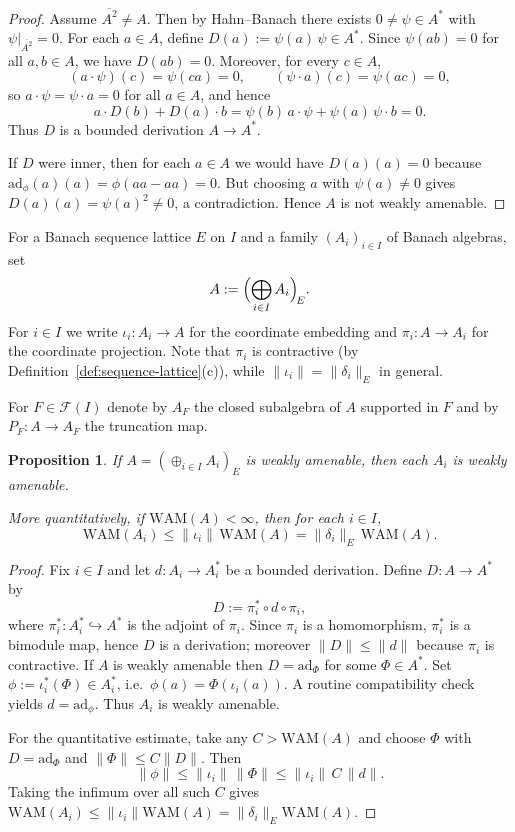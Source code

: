 \documentclass[reqno]{amsart}
\theoremstyle{plain}
\newtheorem{proposition}[theorem]{Proposition}
\theoremstyle{definition}
\theoremstyle{remark}
\newcommand{\cF}{\mathcal{F}}
\renewcommand{\le}{\leqslant}
\newcommand{\ad}{\mathrm{ad}}
\newcommand{\WAM}{\mathrm{WAM}}  %
\begin{document}
\begin{proof}
Assume $\overline{A^2}\neq A$. Then by Hahn--Banach there exists $0\neq\psi\in A^*$ with $\psi|_{\overline{A^2}}=0$.
For each $a\in A$, define $D(a):=\psi(a)\,\psi\in A^*$.
Since $\psi(ab)=0$ for all $a,b\in A$, we have $D(ab)=0$.
Moreover, for every $c\in A$,
\[
(a\cdot\psi)(c)=\psi(ca)=0,\qquad (\psi\cdot a)(c)=\psi(ac)=0,
\]
so $a\cdot\psi=\psi\cdot a=0$ for all $a\in A$, and hence
\[
a\cdot D(b)+D(a)\cdot b=\psi(b)\,a\cdot\psi+\psi(a)\,\psi\cdot b=0.
\]
Thus $D$ is a bounded derivation $A\to A^*$.

If $D$ were inner, then for each $a\in A$ we would have $D(a)(a)=0$ because
$\ad_\phi(a)(a)=\phi(aa-aa)=0$.  But choosing $a$ with $\psi(a)\neq 0$ gives
$D(a)(a)=\psi(a)^2\neq 0$, a contradiction. Hence $A$ is not weakly amenable.
\end{proof}

For a Banach sequence lattice $E$ on $I$ and a family $(A_i)_{i\in I}$ of Banach algebras, set
\[
A:=\Bigl(\bigoplus_{i\in I}A_i\Bigr)_{\!E}.
\]
For $i\in I$ we write $\iota_i\colon A_i\to A$ for the coordinate embedding and $\pi_i\colon A\to A_i$ for the coordinate projection.
Note that $\pi_i$ is contractive (by Definition~\ref{def:sequence-lattice}(c)), while $\|\iota_i\|=\|\delta_i\|_E$ in general.

For $F\in\cF(I)$ denote by $A_F$ the closed subalgebra of $A$ supported in $F$ and by $P_F\colon A\to A_F$ the truncation map.

\begin{proposition}\label{prop:WA-to-summands}
If $A=(\oplus_{i\in I}A_i)_E$ is weakly amenable, then each $A_i$ is weakly amenable.

More quantitatively, if $\WAM(A)<\infty$, then for each $i\in I$,
\[
\WAM(A_i)\le \|\iota_i\|\,\WAM(A)=\|\delta_i\|_E\,\WAM(A).
\]
\end{proposition}


\begin{proof}
Fix $i\in I$ and let $d\colon A_i\to A_i^*$ be a bounded derivation.
Define $D\colon A\to A^*$ by
\[
D:=\pi_i^*\circ d\circ \pi_i,
\]
where $\pi_i^*\colon A_i^*\hookrightarrow A^*$ is the adjoint of $\pi_i$.
Since $\pi_i$ is a homomorphism, $\pi_i^*$ is a bimodule map, hence $D$ is a derivation; moreover
$\|D\|\le \|d\|$ because $\pi_i$ is contractive.
If $A$ is weakly amenable then $D=\ad_\Phi$ for some $\Phi\in A^*$.
Set $\phi:=\iota_i^*(\Phi)\in A_i^*$, i.e.\ $\phi(a)=\Phi(\iota_i(a))$.
A routine compatibility check yields $d=\ad_\phi$.
Thus $A_i$ is weakly amenable.

For the quantitative estimate, take any $C>\WAM(A)$ and choose $\Phi$ with
$D=\ad_\Phi$ and $\|\Phi\|\le C\|D\|$.  Then
\[
\|\phi\|\le \|\iota_i\|\,\|\Phi\|\le \|\iota_i\|\,C\,\|d\|.
\]
Taking the infimum over all such $C$ gives
$\WAM(A_i)\le \|\iota_i\|\WAM(A)=\|\delta_i\|_E\WAM(A)$.
\end{proof}
\end{document}
